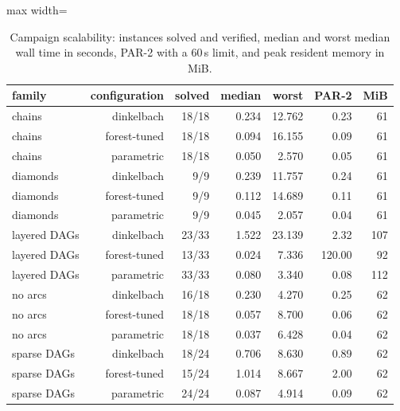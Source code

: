 \begin{table}[tbp]
\centering
\caption{Campaign scalability: instances solved and verified, median and worst median wall time in seconds, PAR-2 with a 60\,s limit, and peak resident memory in MiB.}
\label{tab:scalability}
\small
\begin{adjustbox}{max width=\textwidth}
\begin{tabular}{lrrrrrr}
\toprule
family & configuration & solved & median & worst & PAR-2 & MiB \\
\midrule
chains & dinkelbach & 18/18 & 0.234 & 12.762 & 0.23 & 61 \\
chains & forest-tuned & 18/18 & 0.094 & 16.155 & 0.09 & 61 \\
chains & parametric & 18/18 & 0.050 & 2.570 & 0.05 & 61 \\
diamonds & dinkelbach & 9/9 & 0.239 & 11.757 & 0.24 & 61 \\
diamonds & forest-tuned & 9/9 & 0.112 & 14.689 & 0.11 & 61 \\
diamonds & parametric & 9/9 & 0.045 & 2.057 & 0.04 & 61 \\
layered DAGs & dinkelbach & 23/33 & 1.522 & 23.139 & 2.32 & 107 \\
layered DAGs & forest-tuned & 13/33 & 0.024 & 7.336 & 120.00 & 92 \\
layered DAGs & parametric & 33/33 & 0.080 & 3.340 & 0.08 & 112 \\
no arcs & dinkelbach & 16/18 & 0.230 & 4.270 & 0.25 & 62 \\
no arcs & forest-tuned & 18/18 & 0.057 & 8.700 & 0.06 & 62 \\
no arcs & parametric & 18/18 & 0.037 & 6.428 & 0.04 & 62 \\
sparse DAGs & dinkelbach & 18/24 & 0.706 & 8.630 & 0.89 & 62 \\
sparse DAGs & forest-tuned & 15/24 & 1.014 & 8.667 & 2.00 & 62 \\
sparse DAGs & parametric & 24/24 & 0.087 & 4.914 & 0.09 & 62 \\
\bottomrule
\end{tabular}
\end{adjustbox}
\end{table}
